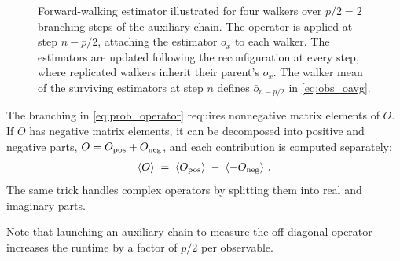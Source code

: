 \documentclass{SciPost}
\providecommand{\expectation}[1]{\left\langle#1\right\rangle}
\begin{document}
\begin{figure}[t]
	\centering
	\caption{Forward-walking estimator illustrated for four	walkers over $p/2 = 2$ branching steps of the auxiliary chain.
		The operator is	applied at step $n-p/2$, attaching the estimator $o_x$ to each walker. 
		The estimators are updated following the reconfiguration at every step, where replicated walkers inherit their parent's $o_x$.
		The walker mean of the surviving estimators at step $n$ defines $\bar o_{n-p/2}$ in	\autoref{eq:obs_oavg}.
	}
	\label{fig:fw_ancestry}
\end{figure}

The branching in \autoref{eq:prob_operator} requires nonnegative matrix elements of $O$.
%
If $O$ has negative matrix elements, it can be decomposed into positive and negative parts, $O = O_{\rm pos} + O_{\rm neg}$, and each contribution is computed separately:
\begin{align}
	\expectation{O} \;=\; \expectation{O_{\rm pos}}	\;-\; \expectation{-O_{\rm neg}}\,.\label{eq:observable_splitting}
\end{align}
The same trick handles complex operators by splitting them into real and imaginary parts.


Note that launching an auxiliary chain to measure the off-diagonal operator increases the runtime by a factor of $p/2$ per observable.
\end{document}
